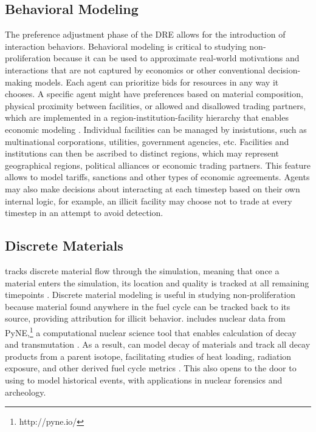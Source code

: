 \subsection{Behavioral Modeling}
The preference adjustment phase of the \gls{DRE} allows for the introduction of interaction behaviors.  Behavioral modeling is critical to studying non-proliferation because it can be used to approximate real-world motivations and interactions that are not captured by economics or other conventional decision-making models.  Each agent can prioritize bids for resources in any way it chooses. A specific agent might have preferences based on material composition, physical proximity between facilities, or allowed and disallowed trading partners, which are implemented in a region-institution-facility hierarchy that enables economic modeling \cite{oliver_geniusv2:_2009}.  Individual facilities can be managed by insistutions, such as multinational corporations, utilities, government agencies, etc.  Facilities and institutions can then be ascribed to distinct regions, which may represent geographical regions, political alliances or economic trading partners. This feature allows \Cyclus to model tariffs, sanctions and other types of economic agreements.    Agents may also make decisions about interacting at each timestep based on their own internal logic, for example, an illicit facility may choose not to trade at every timestep in an attempt to avoid detection. 

\subsection{Discrete Materials}
\Cyclus tracks discrete material flow through the simulation, meaning that once a material enters the simulation, its location and quality is tracked at all remaining timepoints \cite{huff_integrated:_2013}. Discrete material modeling is useful in studying non-proliferation because material found anywhere in the fuel cycle can be tracked back to its source, providing attribution for illicit behavior. \Cyclus includes nuclear data from PyNE,\footnote{http://pyne.io/} a computational nuclear science tool that enables calculation of decay and transmutation \cite{Scopatz2012b}. As a result, \Cyclus can  model decay of materials and track all decay products from a parent isotope, facilitating studies of heat loading, radiation exposure, and other derived fuel cycle metrics \cite{scopatz_cymetric_2015}. This also opens to the door to using \Cyclus to model historical events, with applications in nuclear forensics and archeology.
